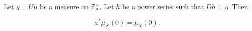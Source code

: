 Let $g = U\mu$ be a measure on $\mathbb{Z}_p^{\times}$. Let $h$ be a power series such that $Dh = g$. Then

$$a^{*}\mu_X(0) = \mu_X(0).$$
